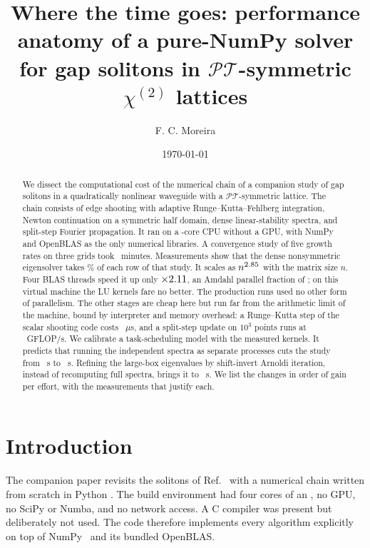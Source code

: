\documentclass[pre,twocolumn,superscriptaddress,longbibliography]{revtex4-2}
\newif\ifaiauthor
\newif\ifshowtodos
\newcommand{\todo}[1]{\ifshowtodos\textcolor{red}{[TODO: #1]}\fi}
\newcommand{\PT}{\mathcal{PT}}
\newcommand{\chit}{\chi^{(2)}}
\begin{document}
\title{Where the time goes: performance anatomy of a pure-NumPy solver\\
for gap solitons in $\PT$-symmetric $\chit$ lattices}

\author{F. C. Moreira}
\affiliation{Universidade Federal de Alagoas, Macei\'o--AL, Brazil \todo{confirm affiliation}}
\ifaiauthor
\author{Claude Opus 5.5}
\affiliation{Anthropic (AI system); code, measurements and first draft produced in Claude Code}
\fi
\date{\today}

\begin{abstract}
We dissect the computational cost of the numerical chain of a companion study of gap solitons in a
quadratically nonlinear waveguide with a $\PT$-symmetric lattice. The chain consists of edge
shooting with adaptive Runge--Kutta--Fehlberg integration, Newton continuation on a symmetric half
domain, dense linear-stability spectra, and split-step Fourier propagation. It ran on a
\nCPU-core CPU without a GPU, with NumPy and OpenBLAS as the only numerical libraries. A
convergence study of five growth rates on three grids took \tConvMeasMin~minutes. Measurements
show that the dense nonsymmetric eigensolver takes \shEigRow\% of each row of that study. It scales
as $n^{2.85}$ with the matrix size $n$. Four BLAS threads speed it up only $\times2.11$, an
Amdahl parallel fraction of \pAmEig; on this virtual machine the LU kernels fare no better. The
production runs used no other form of parallelism. The other stages are cheap here but run far
from the arithmetic limit of the machine, bound by interpreter and memory overhead: a
Runge--Kutta step of the scalar shooting code costs \usRKstep~$\mu$s, and a split-step update on
$10^3$ points runs at \gfSSFsmall~GFLOP/s. We calibrate a task-scheduling model with the measured
kernels. It predicts that running the independent spectra as separate processes cuts the study
from \tProjRun~s to \tProjProc~s. Refining the large-box eigenvalues by shift-invert Arnoldi
iteration, instead of recomputing full spectra, brings it to \tProjArn~s. We list the changes in
order of gain per effort, with the measurements that justify each.
\end{abstract}

\maketitle

\section{Introduction}
The companion paper \cite{Paper1} revisits the solitons of Ref.~\cite{MKM2013} with a numerical
chain written from scratch in Python \cite{NumPy2020}. The build environment had four cores of an
\cpuName, no GPU, no SciPy or Numba, and no network access. A C compiler was present but deliberately
not used. The code therefore implements every algorithm explicitly on top of NumPy \numpyVer\ and
its bundled OpenBLAS.
\end{document}
